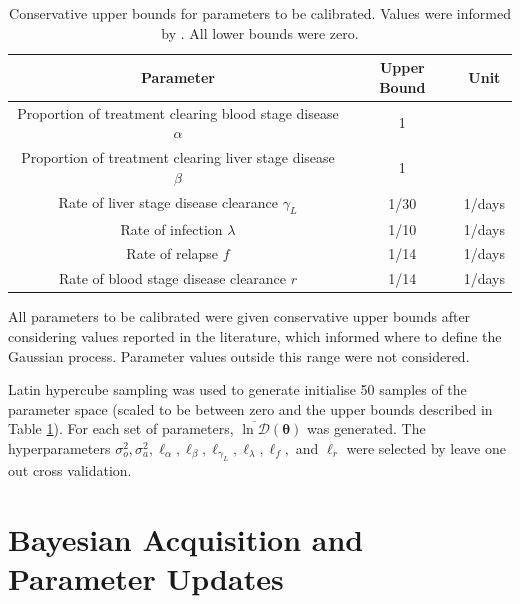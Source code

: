\begin{table}[htbp]
    \centering
    \begin{tabular}{c |c |c}
        Parameter                                                     & Upper Bound & Unit   \\
        \hline
        Proportion of treatment clearing blood stage disease $\alpha$ & 1           &        \\
        Proportion of treatment clearing liver stage disease $\beta$  & 1           &        \\
        Rate of liver stage disease clearance $\gamma_L$              & 1/30        & 1/days \\
        Rate of infection $\lambda$                                   & 1/10        & 1/days \\
        Rate of relapse $f$                                           & 1/14        & 1/days \\
        Rate of blood stage disease clearance $r$                     & 1/14        & 1/days
    \end{tabular}
    \caption{
        Conservative upper bounds for parameters to be calibrated.
        Values were informed by
        \cite{champagne_using_2022, white_variation_2016}. All lower bounds
        were zero.
    }
    \label{table:param_bounds}
\end{table}

All parameters to be calibrated were given conservative upper bounds after 
considering values reported in the literature, which informed where to define
the Gaussian process. Parameter values outside this range were not considered.

Latin hypercube sampling was used to generate initialise 50 samples of the 
parameter space (scaled to be between zero and the upper bounds described in 
Table \ref{table:param_bounds}). For each set of parameters, 
$\overline{\ln\mathcal{D}}(\bm{\theta})$ was generated. The hyper\-parameters
$\sigma_o^2, \sigma_a^2, \ell_\alpha, \ell_\beta,
    \ell_{\gamma_L}, \ell_\lambda, \ell_f,$
and $\ell_r$ were selected by leave one out cross validation.

\section{Bayesian Acquisition and Parameter Updates}


